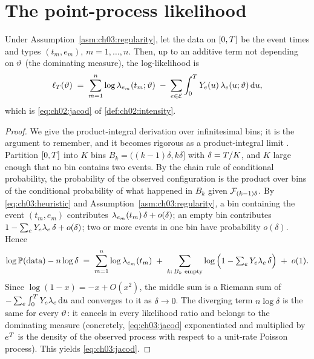 \section{The point-process likelihood}\label{ch03:sec:likelihood}

\begin{theorem}\label{thm:ch03:jacod}
Under Assumption~\ref{asm:ch03:regularity}, let the data on $[0,T]$ be the event
times and types $(t_m, e_m)$, $m = 1,\dots,n$. Then, up to an additive term
not depending on $\vartheta$ (the dominating measure), the log-likelihood
is
\begin{equation}\label{eq:ch03:jacod}
\ell_{T}(\vartheta)
 \;=\;
 \sum_{m=1}^{n} \log \lambda_{e_m}(t_m;\vartheta)
 \;-\;
 \sum_{e\in\mathcal E} \int_0^{T} Y_e(u)\,\lambda_e(u;\vartheta)\,\mathrm{d} u ,
\end{equation}
which is \cref{eq:ch02:jacod} of \cref{def:ch02:intensity}.
\end{theorem}

\begin{proof}
We give the product-integral derivation over infinitesimal bins; it is the
argument to remember, and it becomes rigorous as a product-integral limit
\citep{daley2008,abgk1993}. Partition $[0,T]$ into $K$ bins
$B_k = ((k-1)\delta, k\delta]$ with $\delta = T/K$, and $K$ large
enough that no bin contains two events. By the chain rule of conditional
probability, the probability of the observed configuration is the product
over bins of the conditional probability of what happened in $B_k$ given
$\mathcal{F}_{(k-1)\delta}$. By \cref{eq:ch03:heuristic} and
Assumption~\ref{asm:ch03:regularity}, a bin containing the event $(t_m, e_m)$
contributes $\lambda_{e_m}(t_m)\,\delta + o(\delta)$; an empty bin contributes
$1 - \sum_e Y_e\lambda_e\,\delta + o(\delta)$; two or more events in one
bin have probability $o(\delta)$. Hence
\[
\log \mathbb{P}(\text{data}) - n\log\delta
 \;=\;
 \sum_{m=1}^{n} \log\lambda_{e_m}(t_m)
 \;+\;
 \sum_{k:\,B_k \text{ empty}} \log\Big(1 - \textstyle\sum_e Y_e\lambda_e\,\delta\Big)
 \;+\; o(1).
\]
Since $\log(1-x) = -x + O(x^2)$, the middle sum is a Riemann sum of
$-\sum_e \int_0^{T}Y_e\lambda_e\,\mathrm{d} u$ and converges to it as
$\delta \to 0$. The diverging term $n\log\delta$ is the same for every
$\vartheta$: it cancels in every likelihood ratio and belongs to the
dominating measure (concretely, \cref{eq:ch03:jacod} exponentiated and
multiplied by $e^{T}$ is the density of the observed process with
respect to a unit-rate Poisson process). This yields
\cref{eq:ch03:jacod}.
\end{proof}

